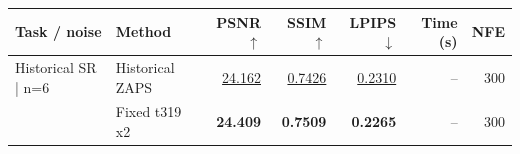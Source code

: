 \begin{tabular}{llrrrrr}
\toprule
Task / noise & Method & PSNR $\uparrow$ & SSIM $\uparrow$ & LPIPS $\downarrow$ & Time (s) & NFE \\
\midrule
Historical SR | n=6 & Historical ZAPS & \underline{24.162} & \underline{0.7426} & \underline{0.2310} & -- & 300 \\
 & Fixed t319 x2 & \textbf{24.409} & \textbf{0.7509} & \textbf{0.2265} & -- & 300 \\
\bottomrule
\end{tabular}
